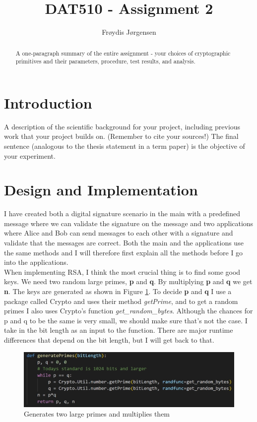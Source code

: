 \documentclass[12pt, letterpaper]{article}
\title{DAT510 - Assignment 2}
\author{Fr\o ydis J\o rgensen}
\begin{document}
\begin{titlepage}
\maketitle
\end{titlepage}

\begin{abstract}
A one-paragraph summary of the entire assignment - your choices of cryptographic primitives and their parameters,
procedure, test results, and analysis. 
\end{abstract}

\section*{Introduction}
A description of the scientific background for your project, including previous work that your project builds on.
(Remember to cite your sources!) The final sentence (analogous to the thesis statement in a term paper) is the
objective of your experiment. 

\section*{Design and Implementation}
I have created both a digital signature scenario in the main with a predefined message where we can validate the signature on the message and two applications where Alice and Bob can send messages to each other with a signature and validate that the messages are correct. Both the main and the applications use the same methods and I will therefore first explain all the methods before I go into the applications. \\

When implementing RSA, I think the most crucial thing is to find some good keys. We need two random large primes, \textbf{p} and \textbf{q}. By multiplying \textbf{p} and \textbf{q} we get \textbf{n}. The keys are generated as shown in Figure \ref{fig:generatePrimes}. To decide \textbf{p} and \textbf{q} I use a package called Crypto and uses their method \textit{getPrime}, and to get a random primes I also uses Crypto's function \textit{get\_random\_bytes}. Although the chances for p and q to be the same is very small, we should make sure that's not the case. I take in the bit length as an input to the function. There are major runtime differences that depend on the bit length, but I will get back to that.

\begin{figure}[H]
  \includegraphics[width=\linewidth]{code_snippets/getPrimes.PNG}
  \caption{Generates two large primes and multiplies them}
  \label{fig:generatePrimes}
\end{figure}
\end{document}

